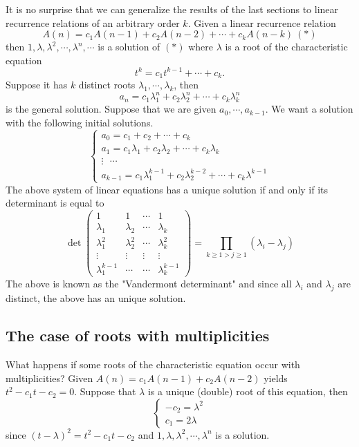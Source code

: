 It is no surprise that we can generalize the results of the last sections to linear recurrence relations of an arbitrary order $k$.
Given a linear recurrence relation
$$
A(n)=c_1A(n-1)+c_2A(n-2)+\cdots+c_kA(n-k)\ (*)
$$
then $1, \lambda, \lambda^2, \cdots, \lambda^n, \cdots$ is a solution of $(*)$ where $\lambda$ is a root of the characteristic equation
$$
t^k=c_1 t^{k-1} + \cdots + c_k.
$$
Suppose it has $k$ distinct roots $\lambda_1, \cdots, \lambda_k$, then 
$$
a_n=c_1 \lambda_1^n + c_2 \lambda_2^n + \cdots + c_k \lambda_k^n
$$
is the general solution. Suppose that we are given $a_0, \cdots, a_{k-1}$. We want a solution with the following initial solutions.
$$
\begin{cases}
    a_0 = c_1 + c_2 + \cdots + c_k\\    
    a_1 = c_1 \lambda_1 + c_2 \lambda_2 + \cdots + c_k \lambda_k\\
    \vdots \text{ } \cdots\\
    a_{k-1}= c_1 \lambda_1^{k-1} + c_2 \lambda_2^{k-2} + \cdots + c_k \lambda^{k-1}   
\end{cases}
$$
The above system of linear equations has a unique solution if and only if its determinant is equal to 
$$
\det\begin{pmatrix} 1 & 1 & \cdots & 1 
    \\ \lambda_1 & \lambda_2 & \cdots & \lambda_k \\
    \lambda_1^2 & \lambda_2^2 & \cdots & \lambda_k^2 \\
    \vdots & \vdots & \vdots & \vdots \\
    \lambda_1^{k-1} & \cdots & \cdots & \lambda_k^{k-1}  
\end{pmatrix} 
= \prod_{k \geq 1 > j \geq 1} (\lambda_i - \lambda_j)
$$
The above is known as the "Vandermont determinant" and since all $\lambda_i$ and $\lambda_j$ are distinct, the above has an unique solution.

\subsection{The case of roots with multiplicities}

What happens if some roots of the characteristic equation occur with multiplicities? Given $A(n)=c_1 A(n-1)+ c_2 A(n-2)$ yields $t^2-c_1t -c_2=0$.
Suppose that $\lambda$ is a unique (double) root of this equation, then
$$
\begin{cases}
    -c_2=\lambda^2\\    
    c_1 = 2 \lambda   
\end{cases}
$$
since $(t-\lambda)^2=t^2 -c_1t-c_2$ and $1, \lambda, \lambda^2, \cdots, \lambda^n$ is a solution.

